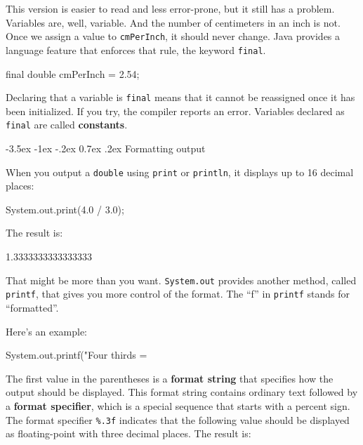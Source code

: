 \documentclass[12pt]{book}
\makeatletter
\theoremstyle{exercise}
\newcommand{\java}[1]{\verb"#1"}
\renewcommand{\section}{\@startsection{section}{1}{\z@}%
    {-3.5ex \@plus -1ex \@minus -.2ex}%
    {0.7ex \@plus.2ex}%
    {\normalfont\Large\bfseries}}
\newcommand{\java}[1]{\lstinline{#1}} %
\makeatother
\begin{document}
This version is easier to read and less error-prone, but it still has a problem.
Variables are, well, variable.
And the number of centimeters in an inch is not.
Once we assign a value to \java{cmPerInch}, it should never change.
Java provides a language feature that enforces that rule, the keyword \java{final}.

\begin{code}
    final double cmPerInch = 2.54;
\end{code}


Declaring that a variable is \java{final} means that it cannot be reassigned once it has been initialized.
If you try, the compiler reports an error.
Variables declared as \java{final} are called {\bf constants}.


\section{Formatting output}

When you output a \java{double} using \java{print} or \java{println}, it displays up to 16 decimal places:

\begin{code}
    System.out.print(4.0 / 3.0);
\end{code}

The result is:

\begin{stdout}
1.3333333333333333
\end{stdout}

That might be more than you want.
\java{System.out} provides another method, called \java{printf}, that gives you more control of the format.
The ``f'' in \java{printf} stands for ``formatted''.

Here's an example:

\begin{code}
    System.out.printf("Four thirds = %
\end{code}


The first value in the parentheses is a {\bf format string} that specifies how the output should be displayed.
This format string contains ordinary text followed by a {\bf format specifier}, which is a special sequence that starts with a percent sign.
The format specifier \verb"%.3f" indicates that the following value should be displayed as floating-point with three decimal places.
The result is:
\end{document}
